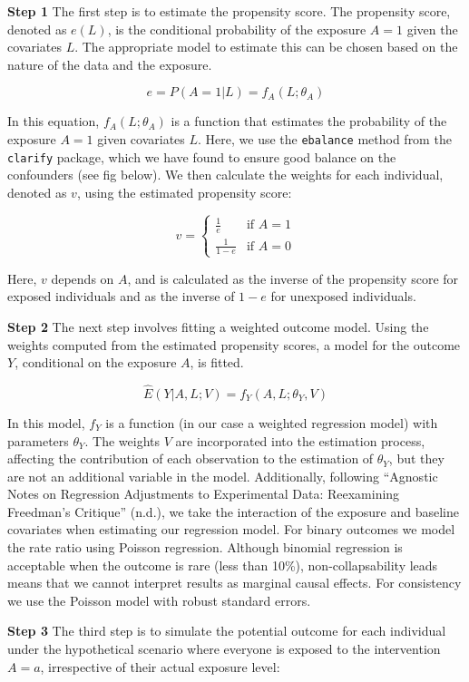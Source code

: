 \documentclass[
  letterpaper,
  DIV=11,
  numbers=noendperiod]{scrartcl}
\begin{document}
\textbf{Step 1} The first step is to estimate the propensity score. The
propensity score, denoted as \(e(L)\), is the conditional probability of
the exposure \(A = 1\) given the covariates \(L\). The appropriate model
to estimate this can be chosen based on the nature of the data and the
exposure.

\[e = P(A = 1 | L) = f_A(L; \theta_A)\]

In this equation, \(f_A(L; \theta_A)\) is a function that estimates the
probability of the exposure \(A = 1\) given covariates \(L\). Here, we
use the \texttt{ebalance} method from the \texttt{clarify} package,
which we have found to ensure good balance on the confounders (see fig
below). We then calculate the weights for each individual, denoted as
\(v\), using the estimated propensity score:

\[
v = 
\begin{cases} 
\frac{1}{e} & \text{if } A = 1 \\
\frac{1}{1-e} & \text{if } A = 0 
\end{cases}
\]

Here, \(v\) depends on \(A\), and is calculated as the inverse of the
propensity score for exposed individuals and as the inverse of \(1-e\)
for unexposed individuals.

\textbf{Step 2} The next step involves fitting a weighted outcome model.
Using the weights computed from the estimated propensity scores, a model
for the outcome \(Y\), conditional on the exposure \(A\), is fitted.

\[ \hat{E}(Y|A, L; V) = f_Y(A, L ; \theta_Y, V) \]

In this model, \(f_Y\) is a function (in our case a weighted regression
model) with parameters \(θ_Y\). The weights \(V\) are incorporated into
the estimation process, affecting the contribution of each observation
to the estimation of \(θ_Y\), but they are not an additional variable in
the model. Additionally, following {``Agnostic Notes on Regression
Adjustments to Experimental Data: Reexamining Freedman{'}s Critique''}
(n.d.), we take the interaction of the exposure and baseline covariates
when estimating our regression model. For binary outcomes we model the
rate ratio using Poisson regression. Although binomial regression is
acceptable when the outcome is rare (less than 10\%), non-collapsability
leads means that we cannot interpret results as marginal causal effects.
For consistency we use the Poisson model with robust standard errors.

\textbf{Step 3} The third step is to simulate the potential outcome for
each individual under the hypothetical scenario where everyone is
exposed to the intervention \(A=a\), irrespective of their actual
exposure level:
\end{document}
